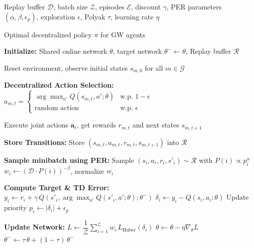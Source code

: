 \begin{algorithm}[t]
\caption{Multi-Agent Dueling DDQN-based FLSO}
\label{alg:dueling-ddqn-flso}
\begin{algorithmic}[1]

\Require
Replay buffer $\mathcal{D}$, batch size $\mathcal{Z}$, episodes $\mathcal{E}$, discount $\gamma$,
PER parameters $(\alpha,\beta,\epsilon_p)$, exploration $\epsilon$, Polyak $\tau$, learning rate $\eta$

\Ensure
Optimal decentralized policy $\pi$ for GW agents

\State \textbf{Initialize:}
Shared online network $\theta$, target network $\theta^{-}\leftarrow \theta$,
Replay buffer $\mathcal{R}$

    \State Reset environment, observe initial states $s_{m,0}$ for all $m \in \mathcal{G}$
        
        \State \textbf{Decentralized Action Selection:}
            \State $a_{m,t} = \begin{cases}
            \arg\max_{a'} Q(s_{m,t}, a'; \theta) & \text{w.p. } 1 - \epsilon \\
            \text{random action} & \text{w.p. } \epsilon
            \end{cases}$
        \EndFor

        \State Execute joint actions $\mathbf{a}_t$, get rewards $r_{m,t}$ and next states $s_{m,t+1}$
        
        \State \textbf{Store Transitions:}
            \State Store $(s_{m,t}, a_{m,t}, r_{m,t}, s_{m,t+1})$ into $\mathcal{R}$
        \EndFor

            \State \textbf{Sample minibatch using PER:}
                \State Sample $(s_i,a_i,r_i,s'_{i}) \sim \mathcal{R}$ with $P(i) \propto p_i^\alpha$
                \State $w_i \leftarrow (\mathcal{D}\cdot P(i))^{-\beta}$, normalize $w_i$
                
                \State \textbf{Compute Target \& TD Error:}
                \State $y_i \leftarrow r_i + \gamma\, Q(s'_{i}, \arg\max_{a'} Q(s'_{i},a';\theta);\theta^{-})$
                \State $\delta_i \leftarrow y_i - Q(s_i,a_i;\theta)$
                \State Update priority $p_i \leftarrow |\delta_i| + \epsilon_p$
            \EndFor

            \State \textbf{Update Network:}
            \State $L \leftarrow \dfrac{1}{\mathcal{Z}}\sum_{i=1}^{\mathcal{Z}} w_i\,L_{\text{Huber}}(\delta_i)$
            \State $\theta \leftarrow \theta - \eta \nabla_\theta L$
            \State $\theta^{-} \leftarrow \tau\,\theta + (1-\tau)\,\theta^{-}$
        \EndIf
    \EndFor
\EndFor

\end{algorithmic}
\end{algorithm}